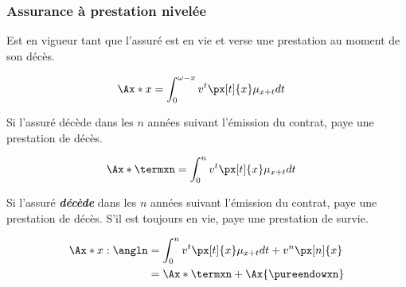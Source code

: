 \documentclass[10pt, french]{article}
\begin{document}
\begin{multicols*}{3}
\subsubsection*{\textcolor{amber(sae/ece)}{Assurance à prestation nivelée}}
\begin{definitionNOHFILLsub}
Est en vigueur tant que l'assuré est en vie et verse une prestation au moment de son décès.

\begin{align*}
	\Ax*{x}
	&= \int_{0}^{\omega - x} v^{t} \px[t]{x} \mu_{x+t} dt 
\end{align*}
\end{definitionNOHFILLsub}


\begin{definitionNOHFILLsub}
Si l'assuré décède dans les $n$ années suivant l'émission du contrat, paye une prestation de décès.

\begin{align*}
	\Ax*{\termxn}
	&= \int_{0}^{n} v^t \px[t]{x} \mu_{x+t} dt 
\end{align*}
\end{definitionNOHFILLsub}




\begin{definitionNOHFILLsub}
Si l'assuré \textbf{\textit{décède}} dans les $n$ années suivant l'émission du contrat, paye une prestation de décès. S'il est toujours en vie, paye une prestation de survie.

\begin{align*}
	\Ax*{x:\angln}
	&= \int_{0}^{n} v^t \px[t]{x} \mu_{x+t} dt + v^n \px[n]{x} \\
	&= \Ax*{\termxn} + \Ax{\pureendowxn} 
\end{align*}
\end{definitionNOHFILLsub}



\end{multicols*}
\end{document}
